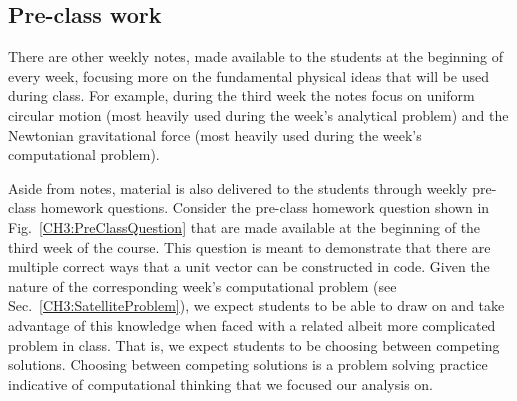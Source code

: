 \documentclass{msuphddissertation}
\begin{document}
\begin{doublespace}
\section{Pre-class work}

There are other weekly notes, made available to the students at the beginning of every week, focusing more on the fundamental physical ideas that will be used during class.  For example, during the third week the notes focus on uniform circular motion (most heavily used during the week's analytical problem) and the Newtonian gravitational force (most heavily used during the week's computational problem).

Aside from notes, material is also delivered to the students through weekly pre-class homework questions.  Consider the pre-class homework question shown in Fig.~\ref{CH3:PreClassQuestion} that are made available at the beginning of the third week of the course.  This question is meant to demonstrate that there are multiple correct ways that a unit vector can be constructed in code.  Given the nature of the corresponding week's computational problem (see Sec.~\ref{CH3:SatelliteProblem}), we expect students to be able to draw on and take advantage of this knowledge when faced with a related albeit more complicated problem in class.  That is, we expect students to be choosing between competing solutions.  Choosing between competing solutions is a problem solving practice indicative of computational thinking that we focused our analysis on.


\end{doublespace}
\end{document}
